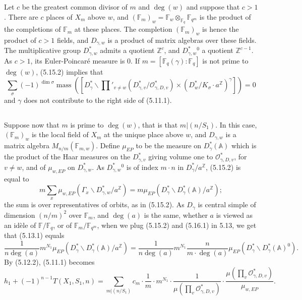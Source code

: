 \documentclass[11pt,a4paper]{article}
\theoremstyle{plain}
\theoremstyle{definition}
\DeclareMathOperator{\mass}{mass}
\newcommand{\Fq}{\mathbb{F}_q}
\newcommand{\F}{\mathbb{F}}
\newcommand{\Z}{\mathbb{Z}}
\begin{document}
\subsection{}
Let $c$ be the greatest common divisor of $m$ and $\deg(w)$ and suppose that $c > 1$. There are $c$ places of $X_m$ above $w$, and $(\mathbb{F}_m)_w = \mathbb{F}_w \otimes_{\Fq} \F_{q^m}$ is the product of the completions of $\mathbb{F}_m$ at these places. The completion $(\mathbb{F}_m)_w$ is hence the product of $c > 1$ fields, and $D_{\gamma,w}$ is a product of matrix algebras over these fields. The multiplicative group $D_{\gamma,w}^*$ admits a quotient $\Z^c$, and $D_{\gamma,w}^*{}^0$ a quotient $\Z^{c-1}$. As $c > 1$, its Euler-Poincar\'e measure is $0$. If $m = [\F_q(\gamma) : \Fq]$ is not prime to $\deg(w)$, (5.15.2) implies that
\[
\sum_\sigma (-1)^{\dim \sigma} \mass([D_\gamma^* \backslash \prod'_{v \neq w} (D_{\gamma,v}^*/\mathcal{O}_{\gamma,D,v}^*) \times (D_w^*/K_\sigma \cdot a^{\Z})^\gamma]) = 0
\]
and $\gamma$ does not contribute to the right side of (5.11.1).

\subsection{}
Suppose now that $m$ is prime to $\deg(w)$, that is that $m | (n/S_1)$. In this case, $(\mathbb{F}_m)_w$ is the local field of $X_m$ at the unique place above $w$, and $D_{\gamma,w}$ is a matrix algebra $M_{n/m}(\mathbb{F}_{m,w})$. Define $\mu_{EP}$ to be the measure on $D_\gamma^*(\mathbb{A})$ which is the product of the Haar measures on the $D_{\gamma,v}^*$ giving volume one to $\mathcal{O}_{\gamma,D,v}^*$, for $v \neq w$, and of $\mu_{w,EP}$ on $D_{\gamma,w}^*$. As $D_{\gamma,w}^*{}^0$ is of index $m \cdot n$ in $D_\gamma^*/a^{\Z}$, (5.15.2) is equal to
\begin{equation}
m \sum_x \mu_{w,EP}(\Gamma_x \backslash D_{\gamma,w}^*/a^{\Z}) = m \mu_{EP}(D_\gamma^* \backslash D_\gamma^*(\mathbb{A})/a^{\Z}); \tag{5.16.1}
\end{equation}
the sum is over representatives of orbits, as in (5.15.2). As $D_\gamma$ is central simple of dimension $(n/m)^2$ over $\mathbb{F}_m$, and $\deg(a)$ is the same, whether $a$ is viewed as an id\`ele of $\mathbb{F}/\Fq$, or of $\mathbb{F}_m/\F_{q^m}$, when we plug (5.15.2) and (5.16.1) in 5.13, we get that (5.13.1) equals
\begin{equation}
\frac{1}{n\deg(a)} m^{N_1} \mu_{EP}(D_\gamma^* \backslash D_\gamma^*(\mathbb{A})/a^{\Z}) = \frac{1}{n\deg(a)} m^{N_1} \frac{n}{m \cdot \deg(a)} \mu_{EP}(D_\gamma^* \backslash D_\gamma^*(\mathbb{A})^0). \tag{5.16.2}
\end{equation}
By (5.12.2), (5.11.1) becomes
\begin{equation}
h_1 + (-1)^{n-1} T(X_1, S_1, n) = \sum_{m | (n/S_1)} c_m \cdot \frac{1}{m} \cdot m^{N_1} \cdot \frac{1}{\mu(\prod_v \mathcal{O}_{\gamma,D,v}^*)} \cdot \frac{\mu(\prod_v \mathcal{O}_{\gamma,D,v}^*)}{\mu_{w,EP}}. \tag{5.16.3}
\end{equation}
\end{document}

